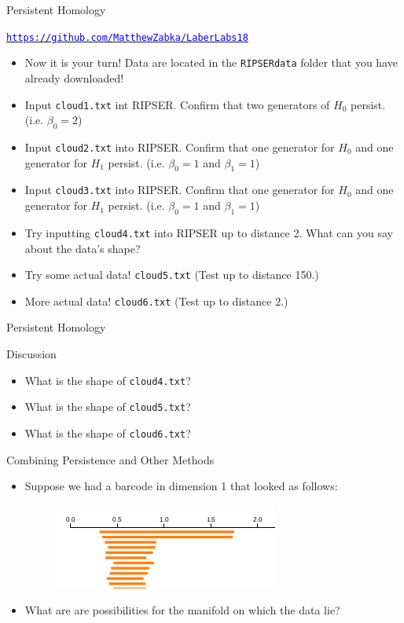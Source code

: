 \documentclass[usenames,dvipsnames,aspectratio=1610]{beamer}
\begin{document}
\begin{frame}{Persistent Homology}
\begin{center}
\hyperref[https://github.com/MatthewZabka/LaberLabs18]{\textcolor{blue}{\texttt{https://github.com/MatthewZabka/LaberLabs18}}}
\end{center}
\begin{itemize}
\item Now it is your turn! Data are located in the \texttt{RIPSERdata} folder that you have already downloaded!
\item Input \texttt{cloud1.txt} int RIPSER. Confirm that two generators of $H_0$ persist. (i.e. $\beta_0 = 2$)
\item Input \texttt{cloud2.txt} into RIPSER. Confirm that one generator for $H_0$ and one generator for $H_1$ persist. (i.e. $\beta_0 = 1$ and $\beta_1 = 1$)
\item Input \texttt{cloud3.txt} into RIPSER. Confirm that one generator for $H_0$ and one generator for $H_1$ persist. (i.e. $\beta_0 = 1$ and $\beta_1 = 1$)
\item Try inputting \texttt{cloud4.txt} into RIPSER up to distance 2. What can you say about the data's shape?
\item Try some actual data! \texttt{cloud5.txt} (Test up to distance 150.)
\item More actual data! \texttt{cloud6.txt} (Test up to distance 2.)
\end{itemize}
\end{frame}
\begin{frame}{Persistent Homology}
\begin{center}
{\Huge Discussion}
\end{center}
\begin{itemize}
\item What is the shape of \texttt{cloud4.txt}?
\item What is the shape of \texttt{cloud5.txt}?
\item What is the shape of \texttt{cloud6.txt}?
\end{itemize}

\end{frame}
\begin{frame}{Combining Persistence and Other Methods}
\begin{itemize}
\item Suppose we had a barcode in dimension 1 that looked as follows:
\begin{figure}
\includegraphics[scale=0.5]{images/torusbar.png}
\end{figure}
\item What are are possibilities for the manifold on which the data lie?
\end{itemize}
\end{frame}
\end{document}
